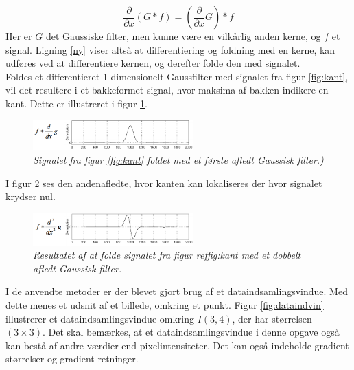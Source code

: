 \begin{equation}
\dfrac{\partial}{\partial x}(G \ast f) = (\dfrac{\partial}{\partial x}G) \ast f
\label{ny}
\end{equation}
Her er $G$ det Gaussiske filter, men kunne være en vilkårlig anden kerne, og $f$ et signal. Ligning \eqref{ny} viser altså at differentiering og foldning med en kerne, kan udføres ved at differentiere kernen, og derefter folde den med signalet.
\\
Foldes et differentieret 1-dimensionelt Gaussfilter med signalet fra figur \ref{fig:kant}, vil det resultere i et bakkeformet signal, hvor maksima af bakken indikere en kant. Dette er illustreret i figur \ref{fig:firstd}.
\begin{figure}[H]
    \centering
    \includegraphics[width=0.55\textwidth]{fig/100.png}
     \vspace{-1em}
    \begin{center}        
     \caption{{\footnotesize \textit{
Signalet fra figur \ref{fig:kant} foldet med et første afledt Gaussisk filter.)}}}
    \label{fig:firstd}
     \end{center}
       \vspace{-2.5em}
  \end{figure}
\noindent
I figur \ref{fig:deriv} ses den andenafledte, hvor kanten kan lokaliseres der hvor signalet krydser nul.
\begin{figure}[H]
    \centering
    \includegraphics[width=0.55\textwidth]{fig/101.png}
    \vspace{-1em}   
    \begin{center}
    \caption{{\footnotesize \textit{
     Resultatet af at folde signalet fra figur ref{fig:kant} med et dobbelt afledt Gaussisk filter.}}}
    \label{fig:deriv}
     \end{center}
    \vspace{-2.5em}  
  \end{figure}
\noindent
I de anvendte metoder er der blevet gjort brug af et dataindsamlingsvindue. Med dette menes et udsnit af et billede, omkring et punkt. Figur \ref{fig:dataindvin} illustrerer et dataindsamlingsvindue omkring $I(3,4)$, der har størrelsen $(3 \times 3)$. Det skal bemærkes, at et dataindsamlingsvindue i denne opgave også kan bestå af andre værdier end pixelintensiteter. Det kan også indeholde gradient størrelser og gradient retninger.
